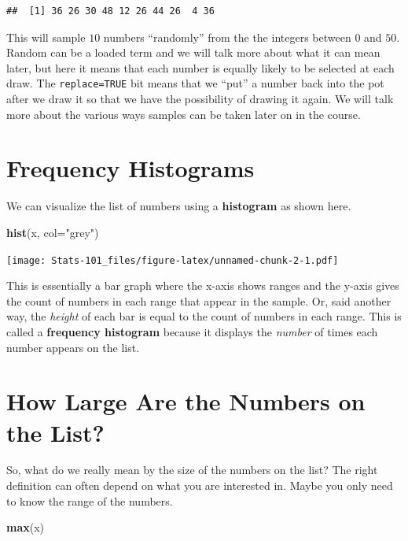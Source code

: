 \documentclass[]{book}
\newenvironment{Shaded}{\begin{snugshade}}{\end{snugshade}}
\newcommand{\DataTypeTok}[1]{\textcolor[rgb]{0.13,0.29,0.53}{#1}}
\newcommand{\KeywordTok}[1]{\textcolor[rgb]{0.13,0.29,0.53}{\textbf{#1}}}
\newcommand{\NormalTok}[1]{#1}
\newcommand{\StringTok}[1]{\textcolor[rgb]{0.31,0.60,0.02}{#1}}
\begin{document}
\begin{verbatim}
##  [1] 36 26 30 48 12 26 44 26  4 36
\end{verbatim}

This will sample \(10\) numbers ``randomly'' from the the integers between \(0\) and \(50\). Random can be a loaded term and we will talk more about what it can mean later, but here it means that each number is equally likely to be selected at each draw. The \texttt{replace=TRUE} bit means that we ``put'' a number back into the pot after we draw it so that we have the possibility of drawing it again. We will talk more about the various ways samples can be taken later on in the course.

\hypertarget{frequency-histograms}{%
\section{Frequency Histograms}\label{frequency-histograms}}

We can visualize the list of numbers using a \textbf{histogram} as shown here.

\begin{Shaded}
\begin{Highlighting}[]
\KeywordTok{hist}\NormalTok{(x, }\DataTypeTok{col=}\StringTok{"grey"}\NormalTok{)}
\end{Highlighting}
\end{Shaded}

\texttt{[image: Stats-101\_files/figure-latex/unnamed-chunk-2-1.pdf]}

This is essentially a bar graph where the x-axis shows ranges and the y-axis gives the count of numbers in each range that appear in the sample. Or, said another way, the \emph{height} of each bar is equal to the count of numbers in each range. This is called a \textbf{frequency histogram} because it displays the \emph{number} of times each number appears on the list.

\hypertarget{how-large-are-the-numbers-on-the-list}{%
\section{How Large Are the Numbers on the List?}\label{how-large-are-the-numbers-on-the-list}}

So, what do we really mean by the size of the numbers on the list? The right definition can often depend on what you are interested in. Maybe you only need to know the range of the numbers.

\begin{Shaded}
\begin{Highlighting}[]
\KeywordTok{max}\NormalTok{(x)}
\end{Highlighting}
\end{Shaded}
\end{document}
